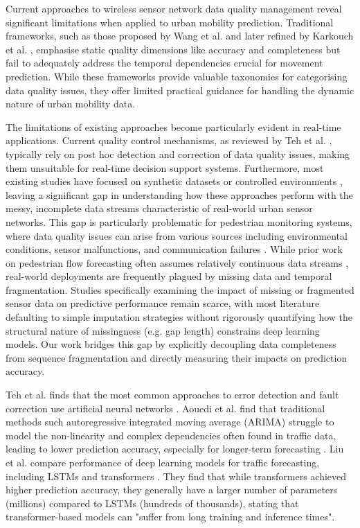 \documentclass[journal,sensors,submit,pdftex,moreauthors]{Definitions/mdpi}
\begin{document}
Current approaches to wireless sensor network data quality management reveal significant limitations when applied to urban mobility prediction. Traditional frameworks, such as those proposed by Wang et al. \cite{wangAccuracyWhatData1996} and later refined by Karkouch et al. \cite{karkouchDataQualityInternet2016}, emphasise static quality dimensions like accuracy and completeness but fail to adequately address the temporal dependencies crucial for movement prediction. While these frameworks provide valuable taxonomies for categorising data quality issues, they offer limited practical guidance for handling the dynamic nature of urban mobility data.

The limitations of existing approaches become particularly evident in real-time applications. Current quality control mechanisms, as reviewed by Teh et al. \cite{tehSensorDataQuality2020}, typically rely on post hoc detection and correction of data quality issues, making them unsuitable for real-time decision support systems. Furthermore, most existing studies have focused on synthetic datasets or controlled environments \citep{shuklaScalableRobustOutlier2020, nguyenForecastingAnomalyDetection2021}, leaving a significant gap in understanding how these approaches perform with the messy, incomplete data streams characteristic of real-world urban sensor networks. This gap is particularly problematic for pedestrian monitoring systems, where data quality issues can arise from various sources including environmental conditions, sensor malfunctions, and communication failures \citep{elkhodrDataProvenanceTrust2020}. While prior work on pedestrian flow forecasting often assumes relatively continuous data streams \citep{aouediDeepLearningNetwork2025a}, real-world deployments are frequently plagued by missing data and temporal fragmentation. Studies specifically examining the impact of missing or fragmented sensor data on predictive performance remain scarce, with most literature defaulting to simple imputation strategies without rigorously quantifying how the structural nature of missingness (e.g. gap length) constrains deep learning models. Our work bridges this gap by explicitly decoupling data completeness from sequence fragmentation and directly measuring their impacts on prediction accuracy.

Teh et al. finds that the most common approaches to error detection and fault correction use artificial neural networks \cite{tehSensorDataQuality2020}. Aouedi et al. find that traditional methods such autoregressive integrated moving average (ARIMA) struggle to model the non-linearity and complex dependencies often found in traffic data, leading to lower prediction accuracy, especially for longer-term forecasting \cite{aouediDeepLearningNetwork2025a}. Liu et al. compare performance of deep learning models for traffic forecasting, including LSTMs and transformers \cite{liuLargeSTBenchmarkDataset2023}. They find that while transformers achieved higher prediction accuracy, they generally have a larger number of parameters (millions) compared to LSTMs (hundreds of thousands), stating that transformer-based models can "suffer from long training and inference times".
\end{document}
